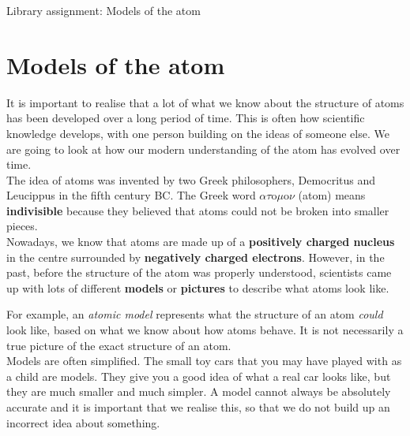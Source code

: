 \begin{project}{Library assignment: Models of the atom}
\begin{minipage}{.4\textwidth}
\end{minipage}

\end{project}

            \section{Models of the atom}
            \nopagebreak
      \label{m38756*id254164}It is important to realise that a lot of what we know about the structure of atoms has been developed over a long period of time. This is often how scientific knowledge develops, with one person building on the ideas of someone else. We are going to look at how our modern understanding of the atom has evolved over time.\\ 
      \label{m38756*id254508}The idea of atoms was invented by two Greek philosophers, Democritus and Leucippus in the fifth century BC. The Greek word $\alpha \tau \text{o}\mu \text{o}\nu$ (atom) means \textbf{indivisible} because they believed that atoms could not be broken into smaller pieces.\\ 
      \label{m38756*id254540}Nowadays, we know that atoms are made up of a \textbf{positively charged nucleus} in the centre
surrounded by \textbf{negatively charged electrons}. However, in the past, before the structure of the atom was properly understood, scientists came up with lots of different \textbf{models} or \textbf{pictures} to describe what atoms look like. 

 For example, an \textsl{atomic model} represents what the structure of an atom \textsl{could} look like, based on what we know about how atoms behave. It is not necessarily a true picture of the exact structure of an atom. \\
Models are often simplified. The small toy cars that you may have played with as a child are models. They give you a good idea of what a real car looks like, but they are much smaller and much simpler. A model cannot always be absolutely accurate and it is important that we realise this, so that we do not build up an incorrect idea about something.
